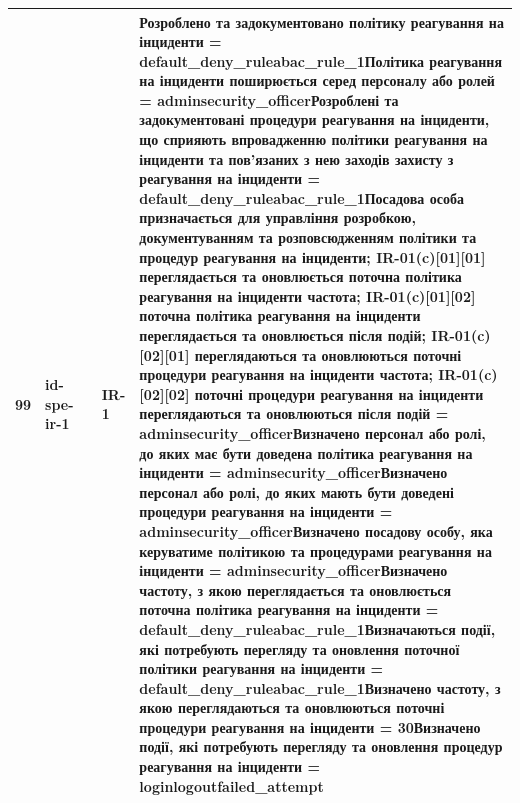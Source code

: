 \documentclass[10pt]{article}
\begin{document}
\begin{longtable}{|c|>{\raggedright\arraybackslash}p{2.5cm}|>{\raggedright\arraybackslash}p{4.5cm}|>{\raggedright\arraybackslash}p{3cm}|>{\raggedright\arraybackslash}p{4.5cm}|}
99 & id-spe-ir-1 &  & IR-1 & Розроблено та задокументовано політику реагування на інциденти = \textbf{default\_\allowbreak{}deny\_\allowbreak{}ruleabac\_\allowbreak{}rule\_\allowbreak{}1}\newline Політика реагування на інциденти поширюється серед персоналу або ролей = \textbf{adminsecurity\_\allowbreak{}officer}\newline Розроблені та задокументовані процедури реагування на інциденти, що сприяють впровадженню політики реагування на інциденти та пов'язаних з нею заходів захисту з реагування на інциденти = \textbf{default\_\allowbreak{}deny\_\allowbreak{}ruleabac\_\allowbreak{}rule\_\allowbreak{}1}\newline Посадова особа призначається для управління розробкою, документуванням та розповсюдженням політики та процедур реагування на інциденти; IR-01(c)[01][01] переглядається та оновлюється поточна політика реагування на інциденти частота; IR-01(c)[01][02] поточна політика реагування на інциденти переглядається та оновлюється після подій; IR-01(c)[02][01] переглядаються та оновлюються поточні процедури реагування на інциденти частота; IR-01(c)[02][02] поточні процедури реагування на інциденти переглядаються та оновлюються після подій = \textbf{adminsecurity\_\allowbreak{}officer}\newline Визначено персонал або ролі, до яких має бути доведена політика реагування на інциденти = \textbf{adminsecurity\_\allowbreak{}officer}\newline Визначено персонал або ролі, до яких мають бути доведені процедури реагування на інциденти = \textbf{adminsecurity\_\allowbreak{}officer}\newline Визначено посадову особу, яка керуватиме політикою та процедурами реагування на інциденти = \textbf{adminsecurity\_\allowbreak{}officer}\newline Визначено частоту, з якою переглядається та оновлюється поточна політика реагування на інциденти = \textbf{default\_\allowbreak{}deny\_\allowbreak{}ruleabac\_\allowbreak{}rule\_\allowbreak{}1}\newline Визначаються події, які потребують перегляду та оновлення поточної політики реагування на інциденти = \textbf{default\_\allowbreak{}deny\_\allowbreak{}ruleabac\_\allowbreak{}rule\_\allowbreak{}1}\newline Визначено частоту, з якою переглядаються та оновлюються поточні процедури реагування на інциденти = \textbf{30}\newline Визначено події, які потребують перегляду та оновлення процедур реагування на інциденти = \textbf{loginlogoutfailed\_\allowbreak{}attempt} \\ \hline

\end{longtable}
\end{document}

